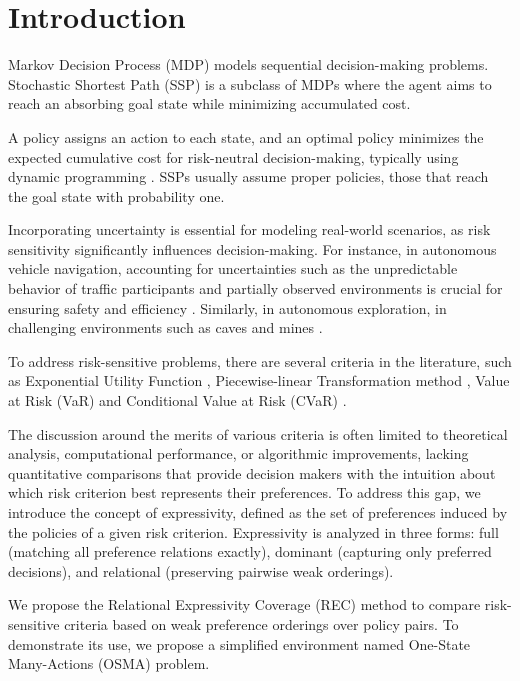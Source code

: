 \documentclass[runningheads]{llncs}
\begin{document}
\section{Introduction}\label{sec:intro}

Markov Decision Process (MDP) \cite{puterman2014markov} models sequential decision-making problems. Stochastic Shortest Path (SSP) \cite{bertsekas1991analysis} is a subclass of MDPs where the agent aims to reach an absorbing goal state while minimizing accumulated cost.

A policy assigns an action to each state, and an optimal policy minimizes the expected cumulative cost for risk-neutral decision-making, typically using dynamic programming \cite{puterman2014markov}. SSPs usually assume proper policies, those that reach the goal state with probability one.

Incorporating uncertainty is essential for modeling real-world scenarios, as risk sensitivity significantly influences decision-making. For instance, in autonomous vehicle navigation, accounting for uncertainties such as the unpredictable behavior of traffic participants and partially observed environments is crucial for ensuring safety and efficiency \cite{autonomous-pomdps2014}. Similarly, in autonomous exploration, in challenging environments such as caves and mines \cite{autonomous-exploration2025}.

To address risk-sensitive problems, there are several criteria in the literature, such as Exponential Utility Function \cite{howard1972risk,exp-utility-function}, Piecewise-linear Transformation method \cite{mihatsch2002risk,piecewise-linear}, Value at Risk (VaR) \cite{jorion2001value} and Conditional Value at Risk (CVaR) \cite{rockafellar2000optimization,artzner1999coherent,chow2015risksensitive}.

The discussion around the merits of various criteria is often limited to theoretical analysis, computational performance, or algorithmic improvements, lacking quantitative comparisons that provide decision makers with the intuition about which risk criterion best represents their preferences. To address this gap, we introduce the concept of expressivity, defined as the set of preferences induced by the policies of a given risk criterion. Expressivity is analyzed in three forms: full (matching all preference relations exactly), dominant (capturing only preferred decisions), and relational (preserving pairwise weak orderings). 

We propose the Relational Expressivity Coverage (REC) method to compare risk-sensitive criteria based on weak preference orderings over policy pairs. To demonstrate its use, we propose a simplified environment named One-State Many-Actions (OSMA) problem.
\end{document}
